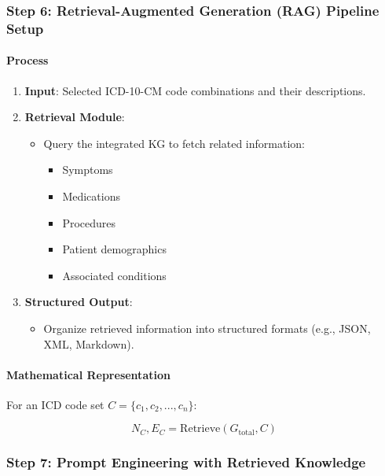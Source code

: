 \documentclass[12pt, a4paper]{article}
\begin{document}
\subsubsection{Step 6: Retrieval-Augmented Generation (RAG) Pipeline Setup}

\paragraph{Process}

\begin{enumerate}
    \item \textbf{Input}: Selected ICD-10-CM code combinations and their descriptions.
    \item \textbf{Retrieval Module}:
    \begin{itemize}
        \item Query the integrated KG to fetch related information:
        \begin{itemize}
            \item Symptoms
            \item Medications
            \item Procedures
            \item Patient demographics
            \item Associated conditions
        \end{itemize}
    \end{itemize}
    \item \textbf{Structured Output}:
    \begin{itemize}
        \item Organize retrieved information into structured formats (e.g., JSON, XML, Markdown).
    \end{itemize}
\end{enumerate}

\paragraph{Mathematical Representation}

For an ICD code set \( C = \{c_1, c_2, ..., c_n\} \):

\begin{equation}
N_C, E_C = \text{Retrieve}(G_{\text{total}}, C)
\end{equation}

\subsubsection{Step 7: Prompt Engineering with Retrieved Knowledge}
\end{document}

